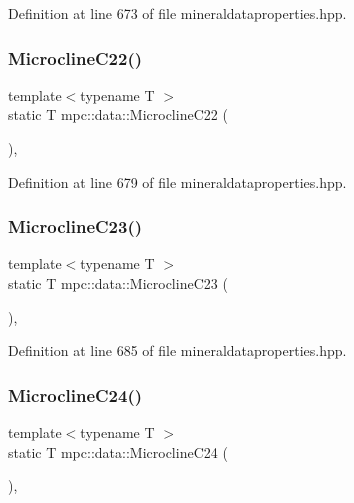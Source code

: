 Definition at line 673 of file mineraldataproperties.\+hpp.

\mbox{\label{namespacempc_1_1data_aacb26b76c540bbffc4bbeeb405779b3b}} 
\subsubsection{\texorpdfstring{Microcline\+C22()}{MicroclineC22()}}
{\footnotesize\ttfamily template$<$typename T $>$ \\
static T mpc\+::data\+::\+Microcline\+C22 (\begin{DoxyParamCaption}{ }\end{DoxyParamCaption})\hspace{0.3cm}{\ttfamily [inline]}, {\ttfamily [static]}}



Definition at line 679 of file mineraldataproperties.\+hpp.

\mbox{\label{namespacempc_1_1data_a5fb6b300ec775eb4f62070b5bc171c95}} 
\subsubsection{\texorpdfstring{Microcline\+C23()}{MicroclineC23()}}
{\footnotesize\ttfamily template$<$typename T $>$ \\
static T mpc\+::data\+::\+Microcline\+C23 (\begin{DoxyParamCaption}{ }\end{DoxyParamCaption})\hspace{0.3cm}{\ttfamily [inline]}, {\ttfamily [static]}}



Definition at line 685 of file mineraldataproperties.\+hpp.

\mbox{\label{namespacempc_1_1data_a67e195b3029c75ee485052379f0f089c}} 
\subsubsection{\texorpdfstring{Microcline\+C24()}{MicroclineC24()}}
{\footnotesize\ttfamily template$<$typename T $>$ \\
static T mpc\+::data\+::\+Microcline\+C24 (\begin{DoxyParamCaption}{ }\end{DoxyParamCaption})\hspace{0.3cm}{\ttfamily [inline]}, {\ttfamily [static]}}



